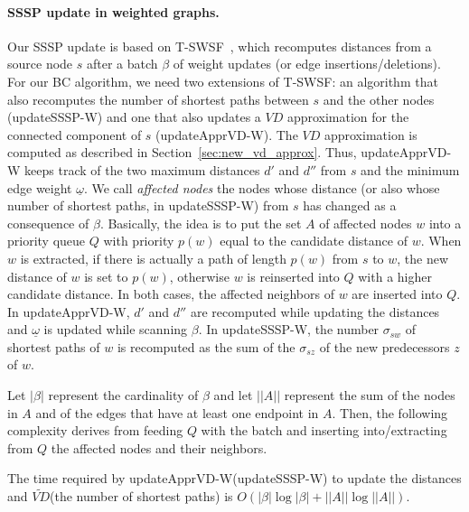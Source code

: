 \documentclass[english]{llncs}
\newcommand{\vd}{$\mathit{VD}$\xspace}
\newcommand{\vda}{$\tilde{\mathit{VD}}$\xspace}
\newcommand{\upvd}{\textsf{updateApprVD-W}\xspace}
\newcommand{\sssp}{\textsf{updateSSSP-W}\xspace}
\begin{document}
\paragraph{SSSP update in weighted graphs.}
Our SSSP update is based on \textsf{T-SWSF}~\cite{DBLP:conf/wea/BauerW09}, which recomputes distances from a source node $s$ after a batch $\beta$ of weight updates (or edge insertions/deletions). For our BC algorithm, we need two extensions of \textsf{T-SWSF}: an algorithm that also recomputes the number of shortest paths between $s$ and the other nodes (\sssp) and one that also updates a \vd approximation for the connected component of $s$ (\upvd). 
The \vd approximation is computed as described in Section~\ref{sec:new_vd_approx}. Thus, \upvd keeps track of the two maximum distances $d'$ and $d''$ from $s$ and the minimum edge weight $\underline{\omega}$.
We call \textit{affected nodes} the nodes whose distance (or also whose number of shortest paths, in \sssp) from $s$ has changed as a consequence of $\beta$. Basically, the idea is to put the set $A$ of affected nodes $w$ into a priority queue $Q$ with priority $p(w)$ equal to the candidate distance of $w$. When $w$ is extracted, if there is actually a path of length $p(w)$ from $s$ to $w$, the new distance of $w$ is set to $p(w)$, otherwise $w$ is reinserted into $Q$ with a higher candidate distance. In both cases, the affected neighbors of $w$ are inserted into $Q$. In \upvd, $d'$ and $d''$ are recomputed while updating the distances and $\underline{\omega}$ is updated while scanning $\beta$.  In \sssp, the number $\sigma_{sw}$ of shortest paths of $w$ is recomputed as the sum of the $\sigma_{sz}$ of the new predecessors $z$ of $w$. 

Let $|\beta |$ represent the cardinality of $\beta$ and let $||A ||$ represent the sum of the nodes in $A$ and of the edges that have at least one endpoint in $A$. Then, the following complexity derives from feeding $Q$ with the batch and inserting into/extracting from $Q$ the affected nodes and their neighbors.
\begin{lemma}
\label{thm:complexity}
The time required by \upvd (\sssp) to update the distances and \vda (the number of shortest paths) is $O(|\beta |\log |\beta | + ||A || \log ||A ||)$.
\end{lemma}
\end{document}
